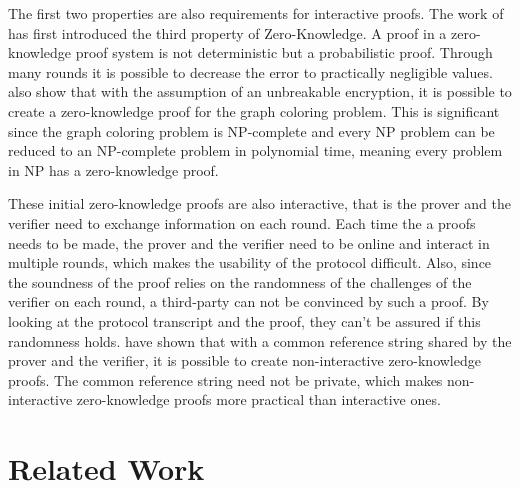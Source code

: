 The first two properties are also requirements for interactive proofs. The work of \cite{Goldwasser.1985} has first introduced the third property of Zero-Knowledge. A proof in a zero-knowledge proof system is not deterministic but a probabilistic proof. Through many rounds it is possible to decrease the error to practically negligible values. \cite{Goldreich.1991} also show that with the assumption of an unbreakable encryption, it is possible to create a zero-knowledge proof for the graph coloring problem. This is significant since the graph coloring problem is NP-complete and every NP problem can be reduced to an NP-complete problem in polynomial time, meaning every problem in NP has a zero-knowledge proof. 

These initial zero-knowledge proofs are also interactive, that is the prover and the verifier need to exchange information on each round. Each time the a proofs needs to be made, the prover and the verifier need to be online and interact in multiple rounds, which makes the usability of the protocol difficult. Also, since the soundness of the proof relies on the randomness of the challenges of the verifier on each round, a third-party can not be convinced by such a proof. By looking at the protocol transcript and the proof, they can't be assured if this randomness holds. \cite{Blum.1988} have shown that with a common reference string shared by the prover and the verifier, it is possible to create non-interactive zero-knowledge proofs. The common reference string need not be private, which makes non-interactive zero-knowledge proofs more practical than interactive ones.

\section{Related Work}
